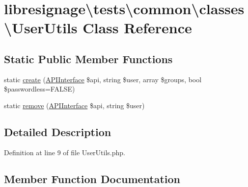 \hypertarget{classlibresignage_1_1tests_1_1common_1_1classes_1_1UserUtils}{}\section{libresignage\textbackslash{}tests\textbackslash{}common\textbackslash{}classes\textbackslash{}User\+Utils Class Reference}
\label{classlibresignage_1_1tests_1_1common_1_1classes_1_1UserUtils}
\subsection*{Static Public Member Functions}
\begin{DoxyCompactItemize}
\item 
static \hyperlink{classlibresignage_1_1tests_1_1common_1_1classes_1_1UserUtils_a986690e7b0e55b1022b3febb111f14dc}{create} (\hyperlink{classlibresignage_1_1tests_1_1common_1_1classes_1_1APIInterface}{A\+P\+I\+Interface} \$api, string \$user, array \$groups, bool \$passwordless=F\+A\+L\+SE)
\item 
static \hyperlink{classlibresignage_1_1tests_1_1common_1_1classes_1_1UserUtils_abd9cef85907dd2e75d7e633641cc74d2}{remove} (\hyperlink{classlibresignage_1_1tests_1_1common_1_1classes_1_1APIInterface}{A\+P\+I\+Interface} \$api, string \$user)
\end{DoxyCompactItemize}


\subsection{Detailed Description}


Definition at line 9 of file User\+Utils.\+php.



\subsection{Member Function Documentation}
\mbox{\label{classlibresignage_1_1tests_1_1common_1_1classes_1_1UserUtils_a986690e7b0e55b1022b3febb111f14dc}} 
